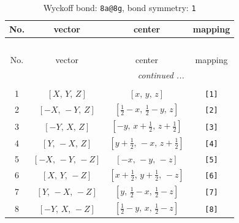 \documentclass[fleqn,8pt]{jsarticle}
\begin{document}
\begin{longtable}{cccc}
\caption{Wyckoff bond: {\tt 8a@8g}, bond symmetry: {\tt 1}}
 \\
 \hline \hline
No. & vector & center & mapping \\ \hline \endfirsthead

\multicolumn{3}{l}{\tablename\ \thetable{}} \\
 \hline \hline
No. & vector & center & mapping \\ \hline \endhead

 \hline \hline
\multicolumn{3}{r}{\footnotesize\it continued ...} \\ \endfoot

 \hline \hline
\multicolumn{3}{r}{} \\ \endlastfoot

1 & $\left[ X,\, Y,\, Z \right]$ & $\left[ x,\, y,\, z \right]$ & {\tt [1]} \\ \hline
2 & $\left[ - X,\, - Y,\, Z \right]$ & $\left[ \frac{1}{2} - x,\, \frac{1}{2} - y,\, z \right]$ & {\tt [2]} \\ \hline
3 & $\left[ - Y,\, X,\, Z \right]$ & $\left[ - y,\, x + \frac{1}{2},\, z + \frac{1}{2} \right]$ & {\tt [3]} \\ \hline
4 & $\left[ Y,\, - X,\, Z \right]$ & $\left[ y + \frac{1}{2},\, - x,\, z + \frac{1}{2} \right]$ & {\tt [4]} \\ \hline
5 & $\left[ - X,\, - Y,\, - Z \right]$ & $\left[ - x,\, - y,\, - z \right]$ & {\tt [5]} \\ \hline
6 & $\left[ X,\, Y,\, - Z \right]$ & $\left[ x + \frac{1}{2},\, y + \frac{1}{2},\, - z \right]$ & {\tt [6]} \\ \hline
7 & $\left[ Y,\, - X,\, - Z \right]$ & $\left[ y,\, \frac{1}{2} - x,\, \frac{1}{2} - z \right]$ & {\tt [7]} \\ \hline
8 & $\left[ - Y,\, X,\, - Z \right]$ & $\left[ \frac{1}{2} - y,\, x,\, \frac{1}{2} - z \right]$ & {\tt [8]} \\
\end{longtable}
\end{document}
